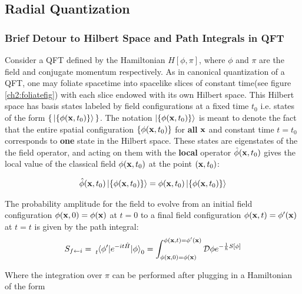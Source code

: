   \subsection{Radial Quantization}
  
  \subsubsection{Brief Detour to Hilbert Space and Path Integrals in QFT}
  
  Consider a QFT defined by the Hamiltonian $H[\phi,\pi]$, where $\phi$ and $\pi$ are the field and conjugate momentum respectively. As in canonical quantization of a QFT, one may foliate spacetime into spacelike slices of constant time(see figure \ref{ch2:foliatefig}) with each slice endowed with its own Hilbert space. This Hilbert space has basis states labeled by field configurations at a fixed time $t_0$ i.e. states of the form $\left\lbrace \, \ket{\{\phi(\bold{x},t_0)\}} \,\right\rbrace$. The notation $\ket{\{\phi(\bold{x},t_0)\}}$ is meant to denote the fact that the entire spatial configuration $\{\phi(\bold{x},t_0)\}$ for \textbf{all} $\bold{x}$ and constant time $t=t_0$ corresponds to \textbf{one} state in the Hilbert space. These states are eigenstates of the the field operator, and acting on them with the \textbf{local} operator $\hat{\phi}(\bold{x},t_0)$ gives the local value of the classical field $\phi(\bold{x},t_0)$ at the point $(\bold{x},t_0)$:
  
  \begin{align}
   \hat{\phi}(\bold{x},t_0) \ket{\{\phi(\bold{x},t_0)\}} = \phi(\bold{x},t_0) \ket{\{\phi(\bold{x},t_0)\}} 
  \end{align}

  
  
  
  The probability amplitude for the field to evolve from an initial field configuration $\phi(\bold{x},0) = \phi(\bold x)$ at $t=0$ to a final field configuration $\phi(\bold{x},t) = \phi^\prime(\bold x)$ at $t=t$ is given by the path integral:
  \begin{align}
   S_{f \leftarrow i} = \tensor[_t]{\braket{\phi^\prime | e^{-it \hat{H}} | \phi}}{_0} = \int_{\phi(\bold{x},0) = \phi(\bold x)}^{\phi(\bold{x},t) = \phi^\prime(\bold x)} \mathcal{D} \phi e^{-\frac{1}{\hbar}S[\phi] }
  \end{align}
  
  Where the integration over $\pi$ can be performed after plugging in a Hamiltonian of the form
  
